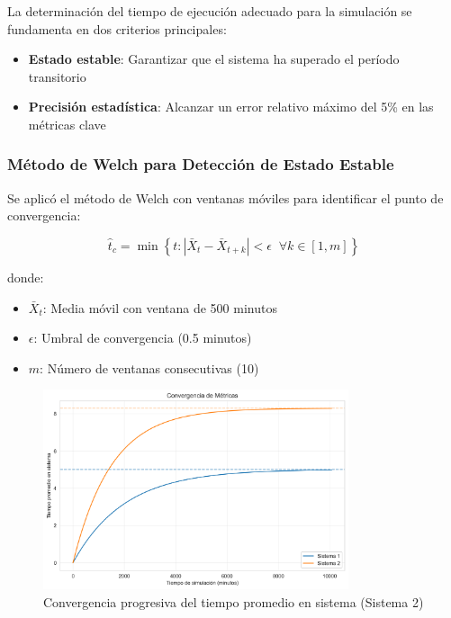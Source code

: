 \documentclass[a4paper, 12pt]{article}
\begin{document}
  La determinación del tiempo de ejecución adecuado para la simulación se fundamenta en dos criterios principales:
  
  \begin{itemize}
  	\item \textbf{Estado estable}: Garantizar que el sistema ha superado el período transitorio
  	\item \textbf{Precisión estadística}: Alcanzar un error relativo máximo del 5\% en las métricas clave
  \end{itemize}
  
  \subsubsection{Método de Welch para Detección de Estado Estable}
  
  Se aplicó el método de Welch con ventanas móviles para identificar el punto de convergencia:
  
  \begin{equation}
  	\hat{t}_c = \min \left\{ t : \left| \bar{X}_t - \bar{X}_{t+k} \right| < \epsilon \;\; \forall k \in [1, m] \right\}
  \end{equation}
  
  donde:
  \begin{itemize}
  	\item $\bar{X}_t$: Media móvil con ventana de 500 minutos
  	\item $\epsilon$: Umbral de convergencia (0.5 minutos)
  	\item $m$: Número de ventanas consecutivas (10)
  \end{itemize}
  
  \begin{figure}[H]
  	\centering
  	\includegraphics[width=0.8\textwidth]{figures/convergence.png}
  	\caption{Convergencia progresiva del tiempo promedio en sistema (Sistema 2)}
  	\label{fig:convergencia}
  \end{figure}
  
\end{document}
